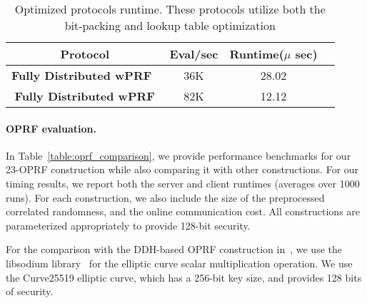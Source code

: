 \begin{table}[htbp]
	\begin{center}
		\begin{tabular}{|c|c|c|c|}
			\hline
			\textbf{Protocol} & \textbf{Eval/sec} & \textbf{Runtime($\mu$ sec)} \\
			\hline
			\hline
			\textbf{Fully Distributed wPRF~\cite{boneh2018-darkmatter}} & 36K & 28.02  \\
			\hline
			\textbf{Fully Distributed wPRF} &  82K &  12.12\\
			\hline
			
		\end{tabular}
		
		\vspace{-1mm}
		\caption{Optimized protocols runtime. These protocols utilize both the bit-packing and lookup table optimization}
		\label{RuntimeTable}
	\end{center}
	\vspace{-5mm}
\end{table}

\paragraph{OPRF evaluation.}
In Table~\ref{table:oprf_comparison}, we provide performance benchmarks for our 23-OPRF construction while also comparing it with other constructions. For our timing results, we report both the server and client runtimes (averages over 1000 runs). For each construction, we also include the size of the preprocessed correlated randomness, and the online communication cost. All constructions are parameterized appropriately to provide 128-bit security.

For the comparison with the DDH-based OPRF construction in~\cite{naor1999-oprf}, we use the libsodium library~\cite{LibSodium} for the elliptic curve scalar multiplication operation. We use the Curve25519 elliptic curve, which has a 256-bit key size, and provides 128 bits of security. 

